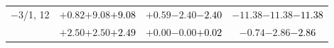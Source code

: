\documentclass[compress]{beamer}
\begin{document}
\begin{frame}
\begin{tabular}{r | c | c | c}
$-$3/1, 12 & $+0.82$\hspace{0.1 cm}$+9.08$\hspace{0.1 cm}\textcolor{black}{$+9.08$} & $+0.59$\hspace{0.1 cm}$-2.40$\hspace{0.1 cm}\textcolor{black}{$-2.40$} & $-11.38$\hspace{0.1 cm}$-11.38$\hspace{0.1 cm}\textcolor{black}{$-11.38$} \\
           & $+2.50$\hspace{0.1 cm}$+2.50$\hspace{0.1 cm}\textcolor{black}{$+2.49$} & $+0.00$\hspace{0.1 cm}$-0.00$\hspace{0.1 cm}\textcolor{black}{$+0.02$} & $-0.74$\hspace{0.1 cm}$-2.86$\hspace{0.1 cm}\textcolor{black}{$-2.86$} \\
\end{tabular}
\end{frame}
\end{document}
